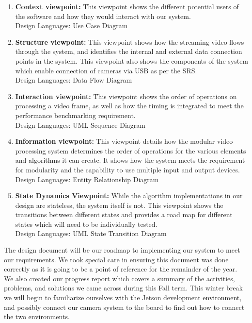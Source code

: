 \begin{enumerate}[leftmargin=2cm,labelindent=2cm]
\item \textbf{Context viewpoint:}
This viewpoint shows the different potential users of the software and how they would
interact with our system.\\
Design Languages: Use Case Diagram
\item \textbf{Structure viewpoint:}
This viewpoint shows how the streaming video flows through the system, and identifies the
internal and external data connection points in the system. This viewpoint also shows the
components of the system which enable connection of cameras via USB as per the SRS.\\
Design Languages: Data Flow Diagram
\item \textbf{Interaction viewpoint:}
This viewpoint shows the order of operations on processing a video frame, as well as how
the timing is integrated to meet the performance benchmarking requirement.\\
Design Languages: UML Sequence Diagram
\item \textbf{Information viewpoint:}
This viewpoint details how the modular video processing system determines the order of
operations for the various elements and algorithms it can create. It shows how the system
meets the requirement for modularity and the capability to use multiple input and output
devices.\\
Design Languages: Entity Relationship Diagram
\item \textbf{State Dynamics Viewpoint:}
While the algorithm implementations in our design are stateless, the system itself is not.
This viewpoint shows the transitions between different states and provides a road map for
different states which will need to be individually tested.\\
Design Languages: UML State Transition Diagram
\end{enumerate}
The design document will be our roadmap to implementing our system to meet our requirements. We took special care in ensuring this document was done correctly as it is going to be a point of reference for the remainder of the year. We also created our progress report which covers a summary of the activities, problems, and solutions we came across during this Fall term. This winter break we will begin to familiarize ourselves with the Jetson development environment, and possibly connect our camera system to the board to find out how to connect the two environments.
